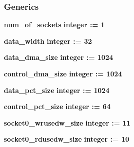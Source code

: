 \subsubsection*{Generics}
 \begin{DoxyCompactItemize}
\item 
{\bf num\+\_\+of\+\_\+sockets} {\bfseries {\bfseries \textcolor{comment}{integer}\textcolor{vhdlchar}{ }\textcolor{vhdlchar}{ }\textcolor{vhdlchar}{\+:}\textcolor{vhdlchar}{=}\textcolor{vhdlchar}{ }\textcolor{vhdlchar}{ } \textcolor{vhdldigit}{1} \textcolor{vhdlchar}{ }}}
\item 
{\bf data\+\_\+width} {\bfseries {\bfseries \textcolor{comment}{integer}\textcolor{vhdlchar}{ }\textcolor{vhdlchar}{ }\textcolor{vhdlchar}{\+:}\textcolor{vhdlchar}{=}\textcolor{vhdlchar}{ }\textcolor{vhdlchar}{ } \textcolor{vhdldigit}{32} \textcolor{vhdlchar}{ }}}
\item 
{\bf data\+\_\+dma\+\_\+size} {\bfseries {\bfseries \textcolor{comment}{integer}\textcolor{vhdlchar}{ }\textcolor{vhdlchar}{ }\textcolor{vhdlchar}{\+:}\textcolor{vhdlchar}{=}\textcolor{vhdlchar}{ }\textcolor{vhdlchar}{ } \textcolor{vhdldigit}{1024} \textcolor{vhdlchar}{ }}}
\item 
{\bf control\+\_\+dma\+\_\+size} {\bfseries {\bfseries \textcolor{comment}{integer}\textcolor{vhdlchar}{ }\textcolor{vhdlchar}{ }\textcolor{vhdlchar}{\+:}\textcolor{vhdlchar}{=}\textcolor{vhdlchar}{ }\textcolor{vhdlchar}{ } \textcolor{vhdldigit}{1024} \textcolor{vhdlchar}{ }}}
\item 
{\bf data\+\_\+pct\+\_\+size} {\bfseries {\bfseries \textcolor{comment}{integer}\textcolor{vhdlchar}{ }\textcolor{vhdlchar}{ }\textcolor{vhdlchar}{\+:}\textcolor{vhdlchar}{=}\textcolor{vhdlchar}{ }\textcolor{vhdlchar}{ } \textcolor{vhdldigit}{1024} \textcolor{vhdlchar}{ }}}
\item 
{\bf control\+\_\+pct\+\_\+size} {\bfseries {\bfseries \textcolor{comment}{integer}\textcolor{vhdlchar}{ }\textcolor{vhdlchar}{ }\textcolor{vhdlchar}{\+:}\textcolor{vhdlchar}{=}\textcolor{vhdlchar}{ }\textcolor{vhdlchar}{ } \textcolor{vhdldigit}{64} \textcolor{vhdlchar}{ }}}
\item 
{\bf socket0\+\_\+wrusedw\+\_\+size} {\bfseries {\bfseries \textcolor{comment}{integer}\textcolor{vhdlchar}{ }\textcolor{vhdlchar}{ }\textcolor{vhdlchar}{\+:}\textcolor{vhdlchar}{=}\textcolor{vhdlchar}{ }\textcolor{vhdlchar}{ } \textcolor{vhdldigit}{11} \textcolor{vhdlchar}{ }}}
\item 
{\bf socket0\+\_\+rdusedw\+\_\+size} {\bfseries {\bfseries \textcolor{comment}{integer}\textcolor{vhdlchar}{ }\textcolor{vhdlchar}{ }\textcolor{vhdlchar}{\+:}\textcolor{vhdlchar}{=}\textcolor{vhdlchar}{ }\textcolor{vhdlchar}{ } \textcolor{vhdldigit}{10} \textcolor{vhdlchar}{ }}}

\end{DoxyCompactItemize}
